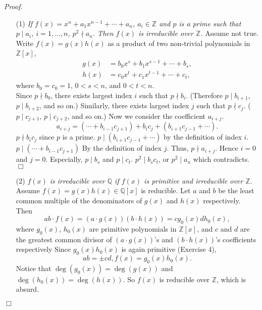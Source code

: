 \documentclass{article}
\begin{document}
\emph{Proof.}
\begin{enumerate}
\item[(1)]
\emph{If $f(x) = x^n + a_1 x^{n-1} + \cdots + a_n$, $a_i \in \mathbb{Z}$
and $p$ is a prime such that $p \mid a_i$, $i = 1, ..., n$, $p^2 \nmid a_n$.
Then $f(x)$ is irreducible over $\mathbb{Z}$.}
Assume not true.
Write $f(x) = g(x)h(x)$ as a product of two non-trivial polynomials in $\mathbb{Z}[x]$,
\begin{align*}
g(x) &= b_0 x^s + b_1 x^{s-1} + \cdots + b_s, \\
h(x) &= c_0 x^t + c_1 x^{t-1} + \cdots + c_t,
\end{align*}
where $b_0 = c_0 = 1$, $0 < s < n$, and $0 < t < n$. \\

Since $p \nmid b_0$, there exists largest index $i$ such that $p \nmid b_i$.
(Therefore $p \mid b_{i+1}$, $p \mid b_{i+2}$, and so on.)
Similarly, there exists largest index $j$ such that $p \nmid c_j$.
($p \mid c_{j+1}$, $p \mid c_{j+2}$, and so on.)
Now we consider the coefficient $a_{i+j}$.
$$a_{i+j} = (\cdots + b_{i-1} c_{j+1}) + b_i c_j + (b_{i+1} c_{j-1} + \cdots).$$
$p \nmid b_i c_j$ since $p$ is a prime.
$p \mid (b_{i+1} c_{j-1} + \cdots)$ by the definition of index $i$.
$p \mid (\cdots + b_{i-1} c_{j+1})$ By the definition of index $j$.
Thus, $p \nmid a_{i+j}$.
Hence $i = 0$ and $j = 0$. Especially, $p \mid b_s$ and $p \mid c_t$.
$p^2 \mid b_s c_t$, or $p^2 \mid a_n$ which contradicts.
$\Box$
\item[(2)]
\emph{$f(x)$ is irreducible over $\mathbb{Q}$
if $f(x)$ is primitive and irreducible over $\mathbb{Z}$.}
Assume $f(x) = g(x)h(x) \in \mathbb{Q}[x]$ is reducible.
Let $a$ and $b$ be the least common multiple of the denominators of
$g(x)$ and $h(x)$ respectively.
Then
$$ab \cdot f(x) = (a \cdot g(x))(b \cdot h(x)) = c g_0(x) d h_0(x),$$
where $g_0(x)$, $h_0(x)$ are primitive polynomials in $\mathbb{Z}[x]$, and
$c$ and $d$ are the greatest common divisor of
$(a \cdot g(x))$'s and $(b \cdot h(x))$'s coefficients respectively
Since $g_0(x) h_0(x)$ is again primitive (Exercise 4),
$$ab = \pm cd, f(x) = g_0(x) h_0(x).$$
Notice that $\deg(g_0(x)) = \deg(g(x))$ and $\deg(h_0(x)) = \deg(h(x))$.
So $f(x)$ is reducible over $\mathbb{Z}$, which is absurd.
\end{enumerate}
$\Box$ \\\\



\end{document}
